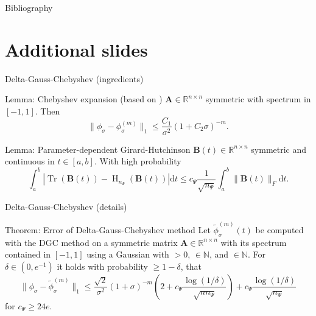 \documentclass[aspectratio=169, leqno, 12pt]{beamer}
\newcommand{\mtx}[1]{\boldsymbol{#1}}
\DeclareMathOperator{\Tr}{Tr}
\DeclareMathOperator{\Hutch}{H}
\begin{document}
\begin{frame}[allowframebreaks]{Bibliography}
    
\end{frame}


\appendix
\section{Additional slides}

\begin{frame}{Delta-Gauss-Chebyshev (ingredients)}
    \begin{block}{Lemma: Chebyshev expansion (based on \cite{trefethen2008gauss})}
        $\mtx{A} \in \mathbb{R}^{n \times n}$ symmetric with spectrum
        in $[-1, 1]$. Then
        \begin{equation}
            \lVert  \phi_{\sigma} - \phi_{\sigma}^{(m)} \rVert _1 \leq \frac{C_1}{\sigma^2}(1 + C_2 \sigma)^{-m}.
        \end{equation}
    \end{block}
    \begin{block}{Lemma: Parameter-dependent Girard-Hutchinson \cite{he2023parameter}}
        $\mtx{B}(t) \in \mathbb{R}^{n \times n}$ symmetric and continuous in
        $t \in [a, b]$. With high probability
        \begin{equation}
            \int_{a}^{b} \left| \Tr(\mtx{B}(t)) - \Hutch_{n_{\Psi}}(\mtx{B}(t)) \right| \mathrm{d}t \leq c_{\Psi} \frac{1}{\sqrt{n_{\Psi}}} \int_{a}^{b} \lVert \mtx{B}(t) \rVert _F \mathrm{d}t.
        \end{equation}
    \end{block}
\end{frame}

\begin{frame}{Delta-Gauss-Chebyshev (details)}
    \begin{block}{Theorem: Error of Delta-Gauss-Chebyshev method}
        Let $\widetilde{\phi}_{\sigma}^{(m)}(t)$ be computed with the \gls{DGC} method
        on a symmetric matrix $\mtx{A} \in \mathbb{R}^{n \times n}$ with its spectrum contained in $[-1, 1]$ using
        a Gaussian  with
         $>0$,  $\in \mathbb{N}$, and
         $\in \mathbb{N}$. For $\delta \in (0, e^{-1})$ it holds with
        probability $\geq 1-\delta$, that
        \begin{equation}
            \lVert \phi_{\sigma} - \widetilde{\phi}_{\sigma}^{(m)}\rVert _1
            \leq \frac{\sqrt{2}}{\sigma^2} (1 + \sigma)^{-m} \left( 2 + c_{\Psi} \frac{\log(1/\delta)}{\sqrt{n n_{\Psi}}} \right) + c_{\Psi} \frac{\log(1/\delta)}{\sqrt{n_{\Psi}}}
        \end{equation}
        for $c_{\Psi} \geq 24e$.
    \end{block}
\end{frame}
\end{document}
